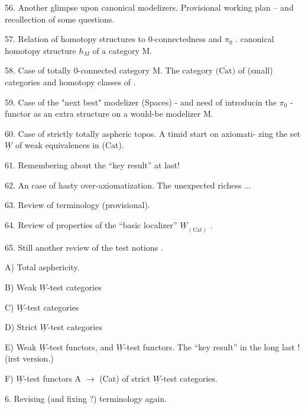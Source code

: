 56. Another glimpse upon canonical modelizers. Provisional working
plan -- and recollection of some questions.

57. Relation of homotopy structures to 0-connectedness and $\pi_0$ . 
canonical homotopy structure $h_M$ of a category M.

58. Case of totally 0-connected category M. The category $\overline{\text{(Cat)}}$ of
(small) categories and homotopy classes of .

59. Case of the "next best" modelizer (Spaces) - and need of introducin
the $\pi_0$ -functor as an extra structure\unsure{*} on a would-be modelizer M.

60. Case of  strictly totally aspheric topos. A timid start on axiomati-%
zing the set $\underline{W}$ of weak equivalences in (Cat).

61. Remembering about the  ``key result'' at last!

62. An  case of hasty over-axiomatization. The unexpected richess ...

63. Review of terminology (provisional).

64. Review of properties of the ``basic localizer'' $\underline{W}_{(\text{Cat})}$ .

65. Still another review of the test notions .

A) Total asphericity.

B) Weak $\underline{W}$-test categories

C) $\underline{W}$-test categories

D) Strict $\underline{W}$-test categories

E) Weak $\underline{W}$-test functors, and $\underline{W}$-test functors. The ``key result'' in
the long last ! (irst version\hand{\unsure{)}}.) 

F) $\underline{W}$-test functors A $\to$ (Cat) of strict $\underline{W}$-test categories.

6. Revising (and fixing ?) terminology again.

